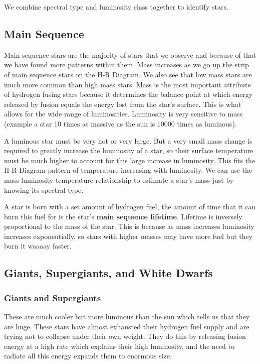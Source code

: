 We combine spectral type and luminosity class together to identify stars.

\subsection{Main Sequence}
Main sequence stars are the majority of stars that we observe and because of that we have found more patterns within them. Mass increases as we go up the strip of main sequence stars on the H-R Diagram. We also see that low mass stars are much more common than high mass stars. Mass is the most important attribute of hydrogen fusing stars because it determines the balance point at which energy released by fusion equals the energy lost from the star's surface. This is what allows for the wide range of luminosities. Luminosity is very sensitive to mass (example a star 10 times as massive as the sun is 10000 times as luminous).

A luminous star must be very hot or very large. But a very small mass change is required to greatly increase the luminosity of a star, so their surface temperature must be much higher to account for this large increase in luminosity. This fits the H-R Diagram pattern of temperature increasing with luminosity. We can use the mass-luminosity-temperature relationship to estimate a star's mass just by knowing its spectral type.

A star is born with a set amount of hydrogen fuel, the amount of time that it can burn this fuel for is the star's \textbf{main sequence lifetime}. Lifetime is inversely proportional to the mass of the star. This is because as mass increases luminosity increases exponentially, so stars with higher masses may have more fuel but they burn it waaaay faster.

\subsection{Giants, Supergiants, and White Dwarfs}
\subsubsection{Giants and Supergiants}
These are much cooler but more luminous than the sun which tells us that they are huge. These stars have almost exhausted their hydrogen fuel supply and are trying not to collapse under their own weight. They do this by releasing fusion energy at a high rate which explains their high luminosity, and the need to radiate all this energy expands them to enormous size.

